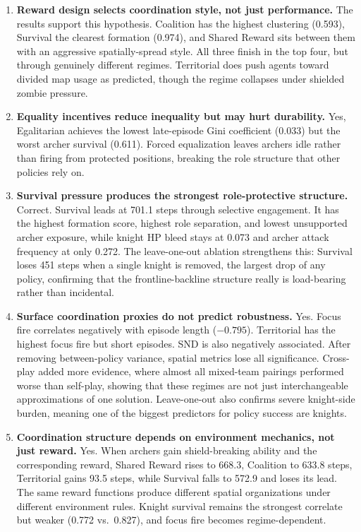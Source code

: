 \begin{enumerate}
    \item \textbf{Reward design selects coordination style, not just performance.} The results support this hypothesis. Coalition has the highest clustering (0.593), Survival the clearest formation (0.974), and Shared Reward sits between them with an aggressive spatially-spread style. All three finish in the top four, but through genuinely different regimes. Territorial does push agents toward divided map usage
    as predicted, though the regime collapses under shielded zombie pressure. 

    \item \textbf{Equality incentives reduce inequality but may hurt durability.} Yes, Egalitarian achieves the lowest late-episode Gini coefficient (0.033) but the worst archer survival (0.611). Forced equalization leaves archers idle rather than firing from protected positions, breaking the role structure that other policies rely on.

    \item \textbf{Survival pressure produces the strongest role-protective structure.}
    Correct. Survival leads at 701.1 steps through selective engagement. It has the highest formation score, highest role separation, and lowest unsupported archer exposure, while knight HP bleed stays at 0.073 and archer attack frequency at only 0.272. The leave-one-out ablation strengthens this: Survival loses 451 steps when a single knight is removed, the largest drop of any policy, confirming that the frontline-backline structure really is load-bearing rather than incidental.

    \item \textbf{Surface coordination proxies do not predict robustness.}
    Yes. Focus fire correlates negatively with episode length ($-0.795$). Territorial has the highest focus fire but short episodes. SND is also negatively associated. After removing between-policy variance, spatial metrics lose all significance. Cross-play added more evidence, where almost all mixed-team pairings performed worse than self-play, showing that these regimes are not just interchangeable approximations of one solution. Leave-one-out also confirms severe knight-side burden, meaning one of the biggest predictors for policy success are knights.

    \item \textbf{Coordination structure depends on environment mechanics, not just reward.} Yes. When archers gain shield-breaking ability and the corresponding reward, Shared Reward rises to 668.3, Coalition to 633.8 steps, Territorial gains 93.5 steps, while Survival falls to 572.9 and loses its lead. The same reward functions produce different spatial organizations under different environment rules. Knight survival remains the strongest correlate but weaker (0.772 vs.\ 0.827), and focus fire becomes regime-dependent.


\end{enumerate}
